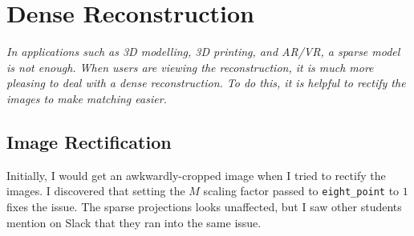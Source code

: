 \section{Dense Reconstruction}

\emph{
  In applications such as 3D modelling, 3D printing, and AR/VR,
  a sparse model is not enough. When users are viewing the reconstruction,
  it is much more pleasing to deal with a dense reconstruction.
  To do this, it is helpful to rectify the images to make matching easier.
}
\subsection{Image Rectification}

\step
Initially, I would get an awkwardly-cropped
image when I tried to rectify the images.
I discovered that setting
the $M$ scaling factor passed to \verb|eight_point| to $1$
fixes the issue. The sparse projections looks unaffected,
but I saw other students mention on Slack that they ran into
the same issue.

